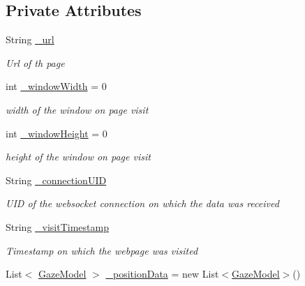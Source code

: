 \subsection*{Private Attributes}
\begin{DoxyCompactItemize}
\item 
String \hyperlink{class_web_analyzer_1_1_models_1_1_data_model_1_1_webpage_model_aea93808218833baaf68514071c973ae4}{\+\_\+url}
\begin{DoxyCompactList}\small\item\em Url of th page \end{DoxyCompactList}\item 
int \hyperlink{class_web_analyzer_1_1_models_1_1_data_model_1_1_webpage_model_ae9604da5bff18321d117bae9c29d19b1}{\+\_\+window\+Width} = 0
\begin{DoxyCompactList}\small\item\em width of the window on page visit \end{DoxyCompactList}\item 
int \hyperlink{class_web_analyzer_1_1_models_1_1_data_model_1_1_webpage_model_a8950b0fab5ad1e804970a6197737e31a}{\+\_\+window\+Height} = 0
\begin{DoxyCompactList}\small\item\em height of the window on page visit \end{DoxyCompactList}\item 
String \hyperlink{class_web_analyzer_1_1_models_1_1_data_model_1_1_webpage_model_af8a807db15e54cbc83463f814c6b4f59}{\+\_\+connection\+U\+I\+D}
\begin{DoxyCompactList}\small\item\em U\+I\+D of the websocket connection on which the data was received \end{DoxyCompactList}\item 
String \hyperlink{class_web_analyzer_1_1_models_1_1_data_model_1_1_webpage_model_ac030b9fb9430a41677eb845ceabd5b26}{\+\_\+visit\+Timestamp}
\begin{DoxyCompactList}\small\item\em Timestamp on which the webpage was visited \end{DoxyCompactList}\item 
List$<$ \hyperlink{class_web_analyzer_1_1_models_1_1_data_model_1_1_gaze_model}{Gaze\+Model} $>$ \hyperlink{class_web_analyzer_1_1_models_1_1_data_model_1_1_webpage_model_a1830061eb9c3046a86386306ac467f25}{\+\_\+position\+Data} = new List$<$\hyperlink{class_web_analyzer_1_1_models_1_1_data_model_1_1_gaze_model}{Gaze\+Model}$>$()

\end{DoxyCompactItemize}
